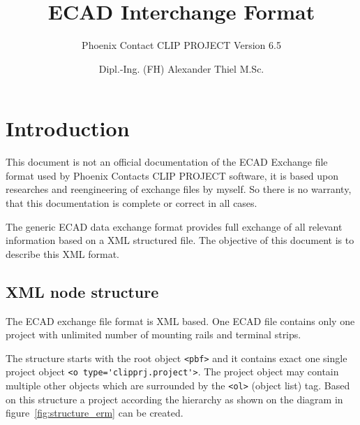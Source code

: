 \documentclass[%
	a4paper,
	oneside,
	listof=numbered,
	parskip=half,
	headsepline=true,
	footsepline=false,
	normalheadings,
	0.7headlines,
	headexclude,
	]{scrbook}
\begin{document}
\title{ECAD Interchange Format}
\subtitle{Phoenix Contact CLIP PROJECT Version 6.5}

\subject{ALX-Development}
\author{Dipl.-Ing. (FH) Alexander Thiel M.Sc.}


\maketitle
\tableofcontents

\chapter{Introduction}

This document is not an official documentation of the ECAD Exchange file format used by Phoenix Contacts
CLIP PROJECT software, it is based upon researches and reengineering of exchange files by myself.
So there is no warranty, that this documentation is complete or correct in all cases.

The generic ECAD data exchange format provides full exchange of all relevant information based on a XML structured file.
The objective of this document is to describe this XML format.

\section{XML node structure}

The ECAD exchange file format is XML based.
One ECAD file contains only one project with unlimited number of mounting rails and terminal strips.

The structure starts with the root object \verb|<pbf>| and it contains exact one single project object \verb|<o type='clipprj.project'>|.
The project object may contain multiple other objects which are surrounded by the \verb|<ol>| (object list) tag.
Based on this structure a project according the hierarchy as shown on the diagram in figure~\ref{fig:structure_erm} can be created.

\end{document}

